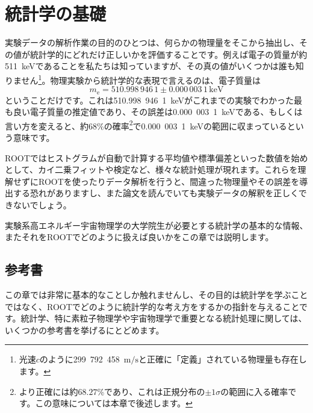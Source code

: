 \chapter{統計学の基礎}
\label{chap:Statistics}

実験データの解析作業の目的のひとつは、何らかの物理量をそこから抽出し、その値が統計学的にどれだけ正しいかを評価することです。例えば電子の質量が約511~keVであることを私たちは知っていますが、その真の値がいくつかは誰も知りません\footnote{光速$c$のように299~792~458~$\mathrm{m}/\mathrm{s}$と正確に「定義」されている物理量も存在します。}。物理実験から統計学的な表現で言えるのは、電子質量は
\begin{equation}
  m_\mathrm{e} = 510.998\,946\,1\pm0.000\,003\,1\,\mathrm{keV}
\end{equation}
ということだけです\cite{Patrignani:2016:Review-of-Particle-Physics}。これは510.998~946~1~keVがこれまでの実験でわかった最も良い電子質量の推定値であり、その誤差は0.000~003~1~keVである、もしくは言い方を変えると、約68\%の確率\footnote{より正確には約$68.27$\%であり、これは正規分布の$\pm1\sigma$の範囲に入る確率です。この意味については本章で後述します。}で0.000~003~1~keVの範囲に収まっているという意味です。

ROOTではヒストグラムが自動で計算する平均値や標準偏差といった数値を始めとして、カイ二乗フィットや検定など、様々な統計処理が現れます。これらを理解せずにROOTを使ったりデータ解析を行うと、間違った物理量やその誤差を導出する恐れがありますし、また論文を読んでいても実験データの解釈を正しくできないでしょう。

実験系高エネルギー宇宙物理学の大学院生が必要とする統計学の基本的な情報、またそれをROOTでどのように扱えば良いかをこの章では説明します。

\section{参考書}

この章では非常に基本的なことしか触れませんし、その目的は統計学を学ぶことではなく、ROOTでどのように統計学的な考え方をするかの指針を与えることです。統計学、特に素粒子物理学や宇宙物理学で重要となる統計処理に関しては、いくつかの参考書を挙げるにとどめます。

